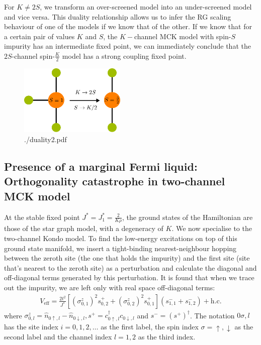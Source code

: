 \documentclass[12pt]{revtex4-2}
\begin{document}
For \(K \neq 2S\), we transform an over-screened model into an under-screened model and vice versa. This duality relationship allows us to infer the RG scaling behaviour of one of the models if we know that of the other. If we know that for a certain pair of values \(K\) and \(S\), the \(K-\)channel MCK model with spin-\(S\) impurity has an intermediate fixed point, we can immediately conclude that the \(2S\)-channel spin-\(\frac{K}{2}\) model has a strong coupling fixed point.
\begin{figure}[htpb]
	\centering
	\includegraphics[width=0.45\textwidth]{./duality2.pdf}
	\caption{./duality2.pdf}
	\label{fig:-duality2-pdf}
\end{figure}

\subsection{Presence of a marginal Fermi liquid: Orthogonality catastrophe in two-channel MCK model}
At the stable fixed point \(J ^* = J_1^* = \frac{2}{K \rho}\), the ground states of the Hamiltonian are those of the star graph model, with a degeneracy of \(K\). We now specialise to the two-channel Kondo model. To find the low-energy excitations on top of this ground state manifold, we insert a tight-binding nearest-neighbour hopping between the zeroth site (the one that holds the impurity) and the first site (site that's nearest to the zeroth site) as a perturbation and calculate the diagonal and off-diagonal terms generated by this perturbation. It is found that when we trace out the impurity, we are left only with real space off-diagonal terms:
\begin{equation}\begin{aligned}
	\label{nfl_terms}
	V_\text{eff} = \frac{2t^2}{J^*}\left[\left(\sigma^z_{0,1}\right)^2 s^+_{0,2} + \left(\sigma^z_{0,2}\right)^2 s^+_{0,1}\right] \left(s^-_{1,1} + s^-_{1,2}\right) + \text{h.c.}
\end{aligned}\end{equation}
where \(\sigma^z_{0,l} = \hat n_{0\uparrow,l} - \hat n_{0\downarrow,l}, s^+ = c^\dagger_{0 \uparrow,l}c_{0 \downarrow,l}\) and \(s^- = \left(s^+\right)^\dagger\). The notation \(0\sigma,l\) has the site index \(i=0,1,2,\ldots\) as the first label, the spin index \(\sigma=\uparrow,\downarrow\) as the second label and the channel index \(l=1,2\) as the third index.
\end{document}
